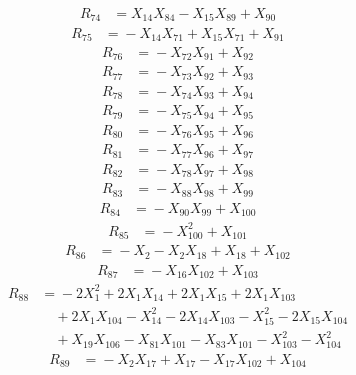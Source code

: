 \[\begin{aligned}
R_{74} &={}X_{14}X_{84} - X_{15}X_{89} + X_{90}
\end{aligned}\]
\[\begin{aligned}
R_{75} &={}-X_{14}X_{71} + X_{15}X_{71} + X_{91}
\end{aligned}\]
\[\begin{aligned}
R_{76} &={}-X_{72}X_{91} + X_{92}
\end{aligned}\]
\[\begin{aligned}
R_{77} &={}-X_{73}X_{92} + X_{93}
\end{aligned}\]
\[\begin{aligned}
R_{78} &={}-X_{74}X_{93} + X_{94}
\end{aligned}\]
\[\begin{aligned}
R_{79} &={}-X_{75}X_{94} + X_{95}
\end{aligned}\]
\[\begin{aligned}
R_{80} &={}-X_{76}X_{95} + X_{96}
\end{aligned}\]
\[\begin{aligned}
R_{81} &={}-X_{77}X_{96} + X_{97}
\end{aligned}\]
\[\begin{aligned}
R_{82} &={}-X_{78}X_{97} + X_{98}
\end{aligned}\]
\[\begin{aligned}
R_{83} &={}-X_{88}X_{98} + X_{99}
\end{aligned}\]
\[\begin{aligned}
R_{84} &={}-X_{90}X_{99} + X_{100}
\end{aligned}\]
\[\begin{aligned}
R_{85} &={}-X_{100}^{2} + X_{101}
\end{aligned}\]
\[\begin{aligned}
R_{86} &={}-X_{2} - X_{2}X_{18} + X_{18} + X_{102}
\end{aligned}\]
\[\begin{aligned}
R_{87} &={}-X_{16}X_{102} + X_{103}
\end{aligned}\]
\[\begin{aligned}
R_{88} &={}-2X_{1}^{2} + 2X_{1}X_{14} + 2X_{1}X_{15} + 2X_{1}X_{103}\\
&\quad{} + 2X_{1}X_{104} - X_{14}^{2} - 2X_{14}X_{103} - X_{15}^{2} - 2X_{15}X_{104}\\
&\quad{} + X_{19}X_{106} - X_{81}X_{101} - X_{83}X_{101} - X_{103}^{2} - X_{104}^{2}
\end{aligned}\]
\[\begin{aligned}
R_{89} &={}-X_{2}X_{17} + X_{17} - X_{17}X_{102} + X_{104}
\end{aligned}\]
